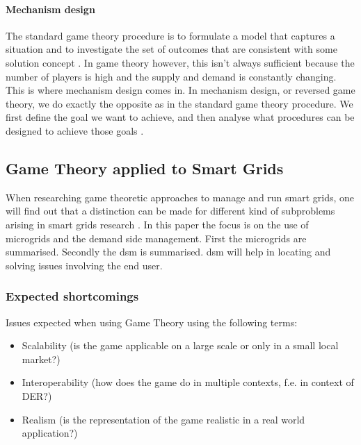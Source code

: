 
\paragraph{Mechanism design}
The standard game theory procedure is to formulate a model that
captures a situation and to investigate the set of outcomes that are
consistent with some solution concept \cite{CourseInGameTheory}. In game theory however, this isn't always sufficient because the number of players is high and the supply and demand is constantly changing. This is where mechanism design comes in. In mechanism design, or reversed game theory, we do exactly the opposite as in the standard game theory procedure. We first define the goal we want to achieve, and then analyse what procedures can be designed to achieve those goals \cite{SalfatiRabinovici2014}. 


\subsection{Game Theory applied to Smart Grids}
When researching game theoretic approaches to manage and run smart grids, one will find out that a distinction can be made for different kind of subproblems arising in smart grids research \cite{keypaper}. In this paper the focus is on the use of microgrids and the demand side management. First the microgrids are summarised. Secondly the \gls{dsm} is summarised. \gls{dsm} will help in locating and solving issues involving the end user. 


\subsubsection{Expected shortcomings}

Issues expected when using Game Theory using the following terms:
\begin{itemize}
	\item Scalability (is the game applicable on a large scale or only in a small local market?)
	\item Interoperability (how does the game do in multiple contexts, f.e. in context of DER?)
	\item Realism (is the representation of the game realistic in a real world application?)
\end{itemize}
